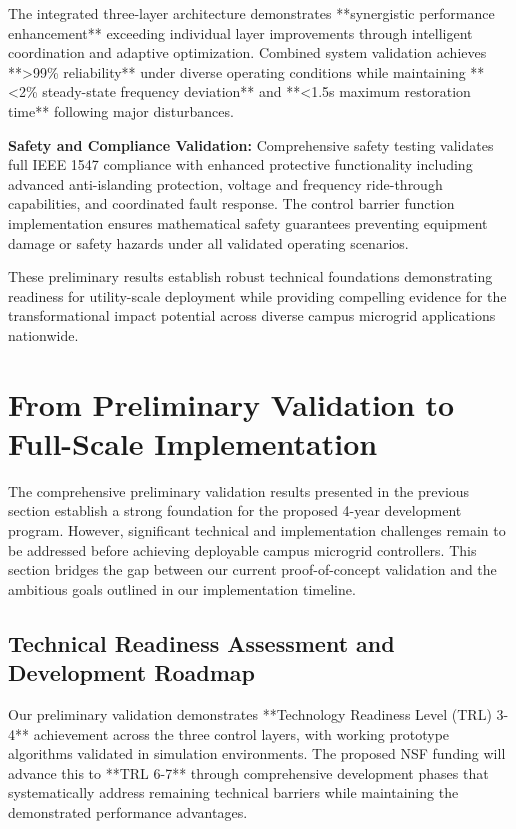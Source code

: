 \documentclass[12pt]{article}
\begin{document}
The integrated three-layer architecture demonstrates **synergistic performance enhancement** exceeding individual layer improvements through intelligent coordination and adaptive optimization. Combined system validation achieves **>99\% reliability** under diverse operating conditions while maintaining **<2\% steady-state frequency deviation** and **<1.5s maximum restoration time** following major disturbances.

\textbf{Safety and Compliance Validation:} Comprehensive safety testing validates full IEEE 1547 compliance with enhanced protective functionality including advanced anti-islanding protection, voltage and frequency ride-through capabilities, and coordinated fault response. The control barrier function implementation ensures mathematical safety guarantees preventing equipment damage or safety hazards under all validated operating scenarios.

These preliminary results establish robust technical foundations demonstrating readiness for utility-scale deployment while providing compelling evidence for the transformational impact potential across diverse campus microgrid applications nationwide.

\section{From Preliminary Validation to Full-Scale Implementation}

The comprehensive preliminary validation results presented in the previous section establish a strong foundation for the proposed 4-year development program. However, significant technical and implementation challenges remain to be addressed before achieving deployable campus microgrid controllers. This section bridges the gap between our current proof-of-concept validation and the ambitious goals outlined in our implementation timeline.

\subsection{Technical Readiness Assessment and Development Roadmap}

Our preliminary validation demonstrates **Technology Readiness Level (TRL) 3-4** achievement across the three control layers, with working prototype algorithms validated in simulation environments. The proposed NSF funding will advance this to **TRL 6-7** through comprehensive development phases that systematically address remaining technical barriers while maintaining the demonstrated performance advantages.
\end{document}
